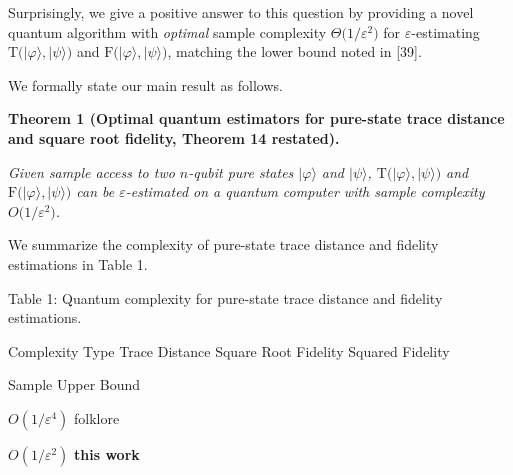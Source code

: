 Surprisingly, we give a positive answer to this question by providing a novel quantum algorithm with \emph{optimal} sample complexity $\Theta\lparen 1/\varepsilon^{2}\rparen$ for $\varepsilon$-estimating $\mathrm{T}\lparen\lvert\varphi\rangle,\lvert\psi\rangle\rparen$ and $\mathrm{F}\lparen\lvert\varphi\rangle,\lvert\psi\rangle\rparen$, matching the lower bound noted in [39].\par




We formally state our main result as follows.\par





\par\medskip\noindent\textbf{
\textbf{Theorem 1}\textbf{ }(Optimal quantum estimators for pure-state trace distance and square root fidelity, Theorem 14 restated)\textbf{.}
}\par



\emph{Given sample access to two $n$-qubit pure states $\lvert\varphi\rangle$ and $\lvert\psi\rangle$, $\mathrm{T}\lparen\lvert\varphi\rangle,\lvert\psi\rangle\rparen$ and $\mathrm{F}\lparen\lvert\varphi\rangle,\lvert\psi\rangle\rparen$ can be $\varepsilon$-estimated on a quantum computer with sample complexity $O\lparen 1/\varepsilon^{2}\rparen$.}\par






We summarize the complexity of pure-state trace distance and fidelity estimations in Table 1.\par



Table 1: Quantum complexity for pure-state trace distance and fidelity estimations.




Complexity Type 
Trace Distance 
Square Root Fidelity 
Squared Fidelity 
\par




Sample Upper Bound 





$O(1/\varepsilon^{4})$ folklore 
\par



$O(1/\varepsilon^{2})$\textbf{ this work}
 
